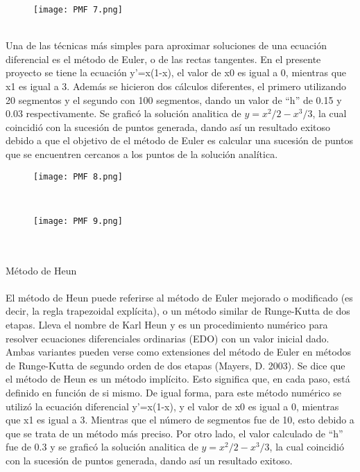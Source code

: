 \documentclass{article}
\begin{document}
 
\begin{figure}[h!]
\centering
\texttt{[image: PMF 7.png]}
\end{figure}
\\

Una de las técnicas más simples para aproximar soluciones de una ecuación diferencial es el método de Euler, o de las rectas tangentes. En el presente proyecto se tiene la ecuación y'=x(1-x), el valor de x0 es igual a 0, mientras que x1 es igual a 3. Además se hicieron dos cálculos diferentes, el primero utilizando 20 segmentos y el segundo con 100 segmentos, dando un valor de “h” de 0.15 y 0.03 respectivamente. Se graficó la solución analitica de $y=x^2/2 - x^3/3$, la cual coincidió con la sucesión de puntos generada, dando así un resultado exitoso debido a que el objetivo de el método de Euler es calcular una sucesión de puntos que se encuentren cercanos a los puntos de la solución analítica.

\begin{figure}[h!]
\centering
\texttt{[image: PMF 8.png]}
\end{figure}
\\

\begin{figure}[h!]
\centering
\texttt{[image: PMF 9.png]}
\end{figure}
\\
\\
Método de Heun
\\
\\
El método de Heun puede referirse al método de Euler mejorado o modificado (es decir, la regla trapezoidal explícita), o un método similar de Runge-Kutta de dos etapas. Lleva el nombre de Karl Heun y es un procedimiento numérico para resolver ecuaciones diferenciales ordinarias (EDO) con un valor inicial dado. Ambas variantes pueden verse como extensiones del método de Euler en métodos de Runge-Kutta de segundo orden de dos etapas (Mayers, D. 2003).
Se dice que el método de Heun es un método implícito. Esto significa que, en cada paso, está definido en función de si mismo. De igual forma, para este método numérico se utilizó la ecuación diferencial y'=x(1-x), y el valor de x0 es igual a 0, mientras que x1 es igual a 3. Mientras que el número de segmentos fue de 10, esto debido a que se trata de un método más preciso. Por otro lado, el valor calculado de “h” fue de 0.3 y se graficó la solución analitica de $y=x^2/2 - x^3/3$, la cual coincidió con la sucesión de puntos generada, dando así un resultado exitoso.
\end{document}
